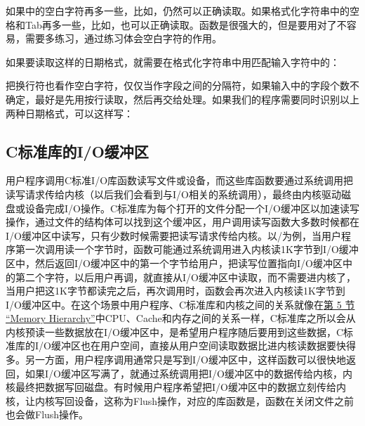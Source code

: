 

如果中的空白字符再多一些，比如，仍然可以正确读取。如果格式化字符串中的空格和Tab再多一些，比如，也可以正确读取。函数是很强大的，但是要用对了不容易，需要多练习，通过练习体会空白字符的作用。



如果要读取这样的日期格式，就需要在格式化字符串中用\BookCode{/\BookSplit{}}匹配输入字符中的\BookCode{/\BookSplit{}}：




把换行符也看作空白字符，仅仅当作字段之间的分隔符，如果输入中的字段个数不确定，最好是先用按行读取，然后再交给处理。如果我们的程序需要同时识别以上两种日期格式，可以这样写：



\subsection{C标准库的I/O缓冲区}
%


用户程序调用C标准I/\BookSplit{}O库函数读写文件或设备，而这些库函数要通过系统调用把读写请求传给内核（以后我们会看到与I/\BookSplit{}O相关的系统调用），最终由内核驱动磁盘或设备完成I/\BookSplit{}O操作。C标准库为每个打开的文件分配一个I/\BookSplit{}O缓冲区以加速读写操作，通过文件的结构体可以找到这个缓冲区，用户调用读写函数大多数时候都在I/\BookSplit{}O缓冲区中读写，只有少数时候需要把读写请求传给内核。以/为例，当用户程序第一次调用读一个字节时，函数可能通过系统调用进入内核读1K字节到I/\BookSplit{}O缓冲区中，然后返回I/\BookSplit{}O缓冲区中的第一个字节给用户，把读写位置指向I/\BookSplit{}O缓冲区中的第二个字符，以后用户再调，就直接从I/\BookSplit{}O缓冲区中读取，而不需要进内核了，当用户把这1K字节都读完之后，再次调用时，函数会再次进入内核读1K字节到I/\BookSplit{}O缓冲区中。在这个场景中用户程序、C标准库和内核之间的关系就像在\hyperlink{db.ch17s05.id2767397}{第 5 节 “Memory Hierarchy”}中CPU、Cache和内存之间的关系一样，C标准库之所以会从内核预读一些数据放在I/\BookSplit{}O缓冲区中，是希望用户程序随后要用到这些数据，C标准库的I/\BookSplit{}O缓冲区也在用户空间，直接从用户空间读取数据比进内核读数据要快得多。另一方面，用户程序调用通常只是写到I/\BookSplit{}O缓冲区中，这样函数可以很快地返回，如果I/\BookSplit{}O缓冲区写满了，就通过系统调用把I/\BookSplit{}O缓冲区中的数据传给内核，内核最终把数据写回磁盘。有时候用户程序希望把I/\BookSplit{}O缓冲区中的数据立刻传给内核，让内核写回设备，这称为Flush操作，对应的库函数是，函数在关闭文件之前也会做Flush操作。



